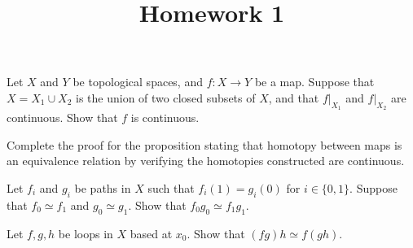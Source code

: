 \documentclass[12pt]{amsart}
\begin{document}
\title{Homework 1}


\maketitle



\begin{problem}
Let $X$ and $Y$ be topological spaces, and $f: X \to Y$ be a map. 
Suppose that $X = X_1 \cup X_2$ is the union of two closed subsets of $X$, and that $f|_{X_1}$ and $f|_{X_2}$ are continuous.
Show that $f$ is continuous.
\end{problem}

\begin{problem}
Complete the proof for the proposition stating that homotopy between maps is an equivalence relation by verifying the homotopies constructed are continuous.
\end{problem}


\begin{problem}
Let $f_i$ and $g_i$ be paths in $X$ such that $f_i(1) = g_i(0)$ for $i \in \{0,1\}$.
Suppose that $f_0 \simeq f_1$ and $g_0\simeq g_1$. Show that $f_0 g_0 \simeq f_1 g_1$. 
\end{problem}

\begin{problem}
Let $f,g,h$ be loops in $X$ based at $x_0$. Show that $(fg)h \simeq f(gh)$.
\end{problem}
\end{document}

